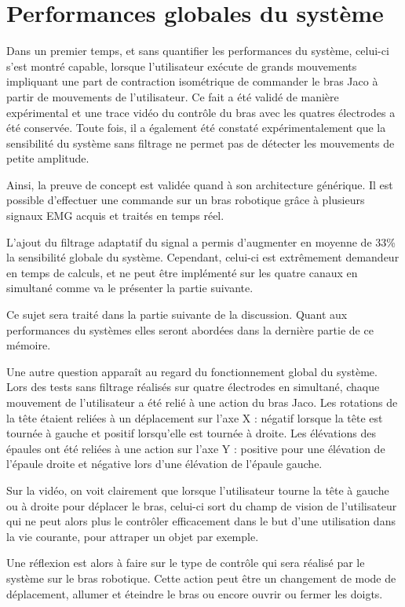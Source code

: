 \documentclass[letterpaper, twoside, 12pt, memoire, creativecommons, hyperref]{thETS}
\begin{document}
\section{Performances globales du système}

Dans un premier temps, et sans quantifier les performances du système, celui-ci s'est montré capable, lorsque l'utilisateur exécute de grands mouvements impliquant une part de contraction isométrique de commander le bras Jaco à partir de mouvements de l'utilisateur. Ce fait a été validé de manière expérimental et une trace vidéo du contrôle du bras avec les quatres électrodes a été conservée. Toute fois, il a également été constaté expérimentalement que la sensibilité du système sans filtrage ne permet pas de détecter les mouvements de petite amplitude. 

Ainsi, la preuve de concept est validée quand à son architecture générique. Il est possible d'effectuer une commande sur un bras robotique grâce à plusieurs signaux EMG acquis et traités en temps réel.

L'ajout du filtrage adaptatif du signal a permis d'augmenter en moyenne de 33\% la sensibilité globale du système. Cependant, celui-ci est extrêmement demandeur en temps de calculs, et ne peut être implémenté sur les quatre canaux en simultané comme va le présenter la partie suivante.

Ce sujet sera traité dans la partie suivante de la discussion. Quant aux performances du systèmes elles seront abordées dans la dernière partie de ce mémoire.

Une autre question apparaît au regard du fonctionnement global du système. Lors des tests sans filtrage réalisés sur quatre électrodes en simultané, chaque mouvement de l'utilisateur a été relié à une action du bras Jaco. Les rotations de la tête étaient reliées à un déplacement sur l'axe X : négatif lorsque la tête est tournée à gauche et positif lorsqu'elle est tournée à droite. Les élévations des épaules ont été reliées à une action sur l'axe Y : positive pour une élévation de l'épaule droite et négative lors d'une élévation de l'épaule gauche. 

Sur la vidéo, on voit clairement que lorsque l'utilisateur tourne la tête à gauche ou à droite pour déplacer le bras, celui-ci sort du champ de vision de l'utilisateur qui ne peut alors plus le contrôler efficacement dans le but d'une utilisation dans la vie courante, pour attraper un objet par exemple. 

Une réflexion est alors à faire sur le type de contrôle qui sera réalisé par le système sur le bras robotique. Cette action peut être un changement de mode de déplacement, allumer et éteindre le bras ou encore ouvrir ou fermer les doigts.
\end{document}
